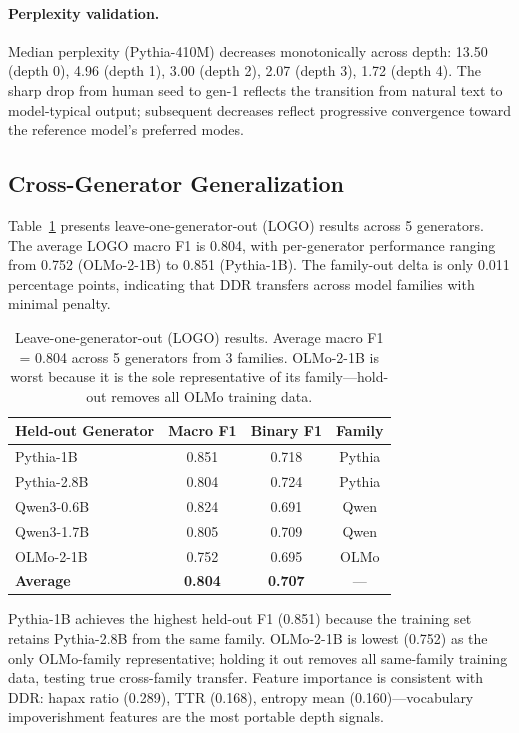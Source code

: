 \documentclass[11pt]{article}
\begin{document}
\paragraph{Perplexity validation.}
Median perplexity (Pythia-410M) decreases monotonically across depth: 13.50 (depth 0), 4.96 (depth 1), 3.00 (depth 2), 2.07 (depth 3), 1.72 (depth 4). The sharp drop from human seed to gen-1 reflects the transition from natural text to model-typical output; subsequent decreases reflect progressive convergence toward the reference model's preferred modes.

\subsection{Cross-Generator Generalization}
\label{sec:cross_gen}

Table~\ref{tab:logo} presents leave-one-generator-out (LOGO) results across 5 generators. The average LOGO macro F1 is 0.804, with per-generator performance ranging from 0.752 (OLMo-2-1B) to 0.851 (Pythia-1B). The family-out delta is only 0.011 percentage points, indicating that DDR transfers across model families with minimal penalty.

\begin{table}[t]
\centering
\small
\begin{tabular}{lccc}
\toprule
\textbf{Held-out Generator} & \textbf{Macro F1} & \textbf{Binary F1} & \textbf{Family} \\
\midrule
Pythia-1B & 0.851 & 0.718 & Pythia \\
Pythia-2.8B & 0.804 & 0.724 & Pythia \\
Qwen3-0.6B & 0.824 & 0.691 & Qwen \\
Qwen3-1.7B & 0.805 & 0.709 & Qwen \\
OLMo-2-1B & 0.752 & 0.695 & OLMo \\
\midrule
\textbf{Average} & \textbf{0.804} & \textbf{0.707} & --- \\
\bottomrule
\end{tabular}
\caption{Leave-one-generator-out (LOGO) results. Average macro F1 = 0.804 across 5 generators from 3 families. OLMo-2-1B is worst because it is the sole representative of its family---hold-out removes all OLMo training data.}
\label{tab:logo}
\end{table}

Pythia-1B achieves the highest held-out F1 (0.851) because the training set retains Pythia-2.8B from the same family. OLMo-2-1B is lowest (0.752) as the only OLMo-family representative; holding it out removes all same-family training data, testing true cross-family transfer. Feature importance is consistent with DDR: hapax ratio (0.289), TTR (0.168), entropy mean (0.160)---vocabulary impoverishment features are the most portable depth signals.
\end{document}
